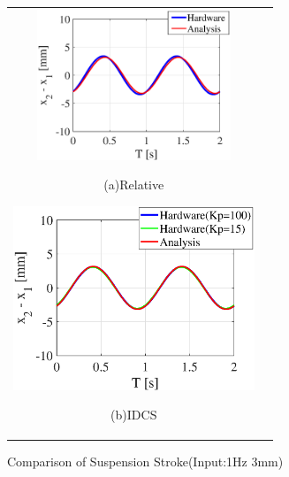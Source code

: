 \documentclass[a4paper,12pt]{article_vdlab_sotsuron}
\begin{document}
\vspace*{5mm}
\begin{figure}[h]
  \begin{tabular}{cc}
  \begin{minipage}{0.5\hsize}
  \begin{center}
    \includegraphics[height=45mm]{figure/sim_rela_3_1.eps}
    \end{center}
    \begin{center}
    \ (a)Relative\
    \end{center}
  \end{minipage}
  \begin{minipage}{0.5\hsize}
     \begin{center}
      \includegraphics[height=55mm]{figure/sim_linear_3_1.eps}
      \end{center}
      \begin{center}
      \ (b)IDCS\
    \end{center}
  \end{minipage}
  \end{tabular}
  \vspace*{2mm}
  \caption{Comparison of Suspension Stroke(Input:1Hz 3mm)}
    \label{fig:sim_3_1}
\end{figure}
\end{document}
